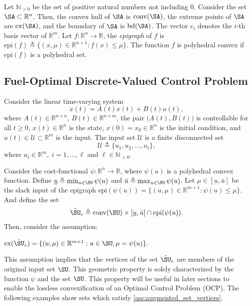 \documentclass[conf]{new-aiaa}
\newcounter{enumA}
\begin{document}
Let $\mathbb{N}_{>0}$ be the set of positive natural numbers not including 0. Consider the set $\SA \subset \mathbb{R}^n$. Then, the convex hull of $\SA$ is $\mathrm{conv}(\SA)$, the extreme points of $\SA$ are $\mathrm{ex}(\SA)$, and the boundary of $\SA$ is $\mathrm{bd}(\SA)$. The vector $e_i$ denotes the $i$-th basis vector of $\mathbb R^m$. Let $f:\mathbb{R}^{n} \to \mathbb{R}$, the \emph{epigraph} of $f$ is $\mathrm{epi}(f) \triangleq \{(x,\mu) \in \mathbb{R}^{n+1}: f(x) \leq \mu\}$. The function $f$ is polyhedral convex if $\mathrm{epi}(f)$ is a polyhedral set.

\subsection{Fuel-Optimal Discrete-Valued Control Problem}

Consider the linear time-varying system
%
\begin{equation}\label{eq:linear_system}
    \dot{x}(t) = A(t) x(t) + B(t) u(t),
\end{equation}
%
where $A(t) \in \mathbb{R}^{n \times n}$, $B(t) \in \mathbb{R}^{n \times m}$, the pair $\big(A(t),B(t)\big)$ is controllable for all $t\geq0$, $x(t) \in \mathbb{R}^n$ is the state, $x(0) = x_0 \in \mathbb{R}^n$ is the initial condition, and $u(t) \in \mathcal{U} \subset \mathbb{R}^m$ is the input. The input set $\mathcal{U}$ is a finite disconnected set
%
\begin{equation}\label{eq:input_set}
    \mathcal{U} \triangleq \{u_1, u_2, \ldots, u_{\ell}\},
\end{equation}
%
where $u_i \in \mathbb{R}^m,\; i=1,\ldots,\ell$ and $\ell \in \mathbb{N}_{>0}$. 

Consider the cost-functional $\psi: \mathbb{R}^n \to \mathbb{R}$, where $\psi(u)$ is a polyhedral convex function. Define $\underline{u} \triangleq \min_{u \in \SU} \psi(u)$ and $\bar{u} \triangleq \max_{u \in \SU} \psi(u)$. Let $\mu \in [\underline{u}, \bar{u}]$ be the slack input of the epigraph $\mathrm{epi}(\psi(u)) = \{(u,\mu) \in \mathbb{R}^{m+1}: \psi(u) \leq \mu\}$. And define the set
%
\begin{equation}\label{eq:relaxed_set}
    \tilde{\SU}_e \triangleq \mathrm{conv}(\SU) \times [\underline{u}, \bar{u}] \cap \mathrm{epi}(\psi(u)).
\end{equation}
%
Then, consider the assumption:
%
\begin{enumA}
    \item $\mathrm{ex}(\tilde{\SU}_e) = \{(u,\mu) \in \mathbb{R}^{m+1}: u \in \SU, \mu = \psi(u)\}.$ \label{ass:augmented_set_vertices}
\end{enumA}
%
This assumption implies that the vertices of the set $\tilde{\SU}_e$ are members of the original input set $\SU$. This geometric property is solely characterized by the function $\psi$ and the set $\SU$. This property will be useful in later sections to enable the lossless convexification of an Optimal Control Problem (OCP). The following examples show sets which satisfy \ref{ass:augmented_set_vertices}.
\end{document}
